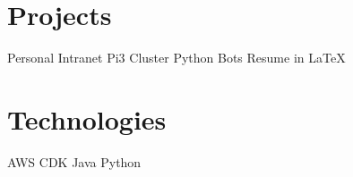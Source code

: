 \documentclass[]{friggeri-cv}
\begin{document}
\begin{aside}
  \section{Projects}
    \bullet\hspace{0.2cm}Personal Intranet
    \bullet\hspace{0.2cm}Pi3 Cluster
    \bullet\hspace{0.2cm}Python Bots
    \bullet\hspace{0.2cm}Resume in LaTeX
    ~
  \section{Technologies}
    \bullet\hspace{0.2cm}AWS CDK
    \bullet\hspace{0.2cm}Java
    \bullet\hspace{0.2cm}Python
    ~
\end{aside}
\end{document}
